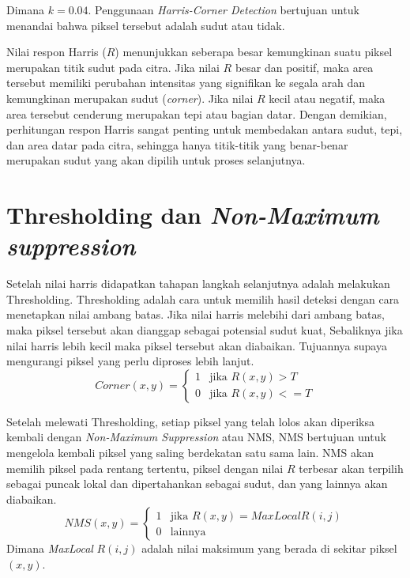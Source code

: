     Dimana \(k = 0.04\). Penggunaan \emph{Harris-Corner Detection} bertujuan untuk menandai bahwa piksel tersebut adalah sudut atau tidak.

    Nilai respon Harris (\(R\)) menunjukkan seberapa besar kemungkinan suatu piksel merupakan titik sudut pada citra. Jika nilai \(R\) besar dan positif, maka area tersebut memiliki perubahan intensitas yang signifikan ke segala arah dan kemungkinan merupakan sudut (\emph{corner}). Jika nilai \(R\) kecil atau negatif, maka area tersebut cenderung merupakan tepi atau bagian datar. Dengan demikian, perhitungan respon Harris sangat penting untuk membedakan antara sudut, tepi, dan area datar pada citra, sehingga hanya titik-titik yang benar-benar merupakan sudut yang akan dipilih untuk proses selanjutnya.

\section{Thresholding dan \emph{Non-Maximum suppression}}
    Setelah nilai harris didapatkan tahapan langkah selanjutnya adalah melakukan Thresholding.
Thresholding adalah cara untuk memilih hasil deteksi dengan cara menetapkan nilai ambang batas.
Jika nilai harris melebihi dari ambang batas, maka piksel tersebut akan dianggap sebagai potensial sudut kuat, Sebaliknya jika nilai harris lebih kecil maka piksel tersebut akan diabaikan.
Tujuannya supaya mengurangi piksel yang perlu diproses lebih lanjut.
\begin{equation}
    Corner(x,y) = 
    \begin{cases}  
        1 & \text{jika } R(x,y) > T \\ 
        0 & \text{jika } R(x,y) <= T
    \end{cases}
\end{equation}

    Setelah melewati Thresholding, setiap piksel yang telah lolos akan diperiksa kembali dengan \emph{Non-Maximum Suppression} atau NMS,
NMS bertujuan untuk mengelola kembali piksel yang saling berdekatan satu sama lain. NMS akan memilih piksel pada rentang tertentu, piksel dengan nilai \(R\) terbesar akan terpilih sebagai puncak lokal dan dipertahankan sebagai sudut, dan yang lainnya akan diabaikan.
\begin{equation*}
    NMS(x,y) =
    \begin{cases}
        1 & \text{jika } R(x,y) = MaxLocal R(i,j) \\
        0 & \text{lainnya }
    \end{cases}
\end{equation*}
Dimana \emph{MaxLocal} \(R(i,j)\) adalah nilai maksimum yang berada di sekitar piksel \((x,y)\).

